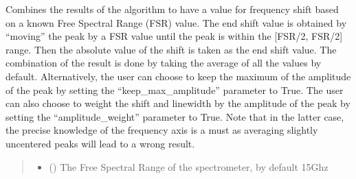 \documentclass[letterpaper,10pt,english]{sphinxmanual}
\begin{document}
\begin{fulllineitems}
\begin{fulllineitems}
\begin{quote}
\begin{description}
\end{description}\end{quote}

\end{fulllineitems}


\begin{fulllineitems}
\label{\detokenize{source/_autosummary/HDF5_BLS_treat.Treat:HDF5_BLS_treat.Treat.combine_results_FSR}}
\pysigstartsignatures
\pysiglinewithargsret
{}
{\sphinxparamcomma {}\sphinxparamcomma {}\sphinxparamcomma {}\sphinxparamcomma {}}
{}
\pysigstopsignatures
\sphinxAtStartPar
Combines the results of the algorithm to have a value for frequency shift based on a known Free Spectral Range (FSR) value. The end shift value is obtained by “moving” the peak by a FSR value until the peak is within the {[}\sphinxhyphen{}FSR/2, FSR/2{]} range. Then the absolute value of the shift is taken as the end shift value.
The combination of the result is done by taking the average of all the values by default. Alternatively, the user can choose to keep the maximum of the amplitude of the peak by setting the “keep\_max\_amplitude” parameter to True. The user can also choose to weight the shift and linewidth by the amplitude of the peak by setting the “amplitude\_weight” parameter to True. Note that in the latter case, the precise knowledge of the frequency axis is a must as averaging slightly uncentered peaks will lead to a wrong result.
\begin{quote}\begin{description}
\begin{itemize}
\item {} 
\sphinxAtStartPar
{} (\sphinxstyleliteralemphasis{\sphinxupquote{, }}) \textendash{} The Free Spectral Range of the spectrometer, by default 15Ghz


\end{itemize}
\end{description}
\end{quote}
\end{fulllineitems}
\end{fulllineitems}
\end{document}
